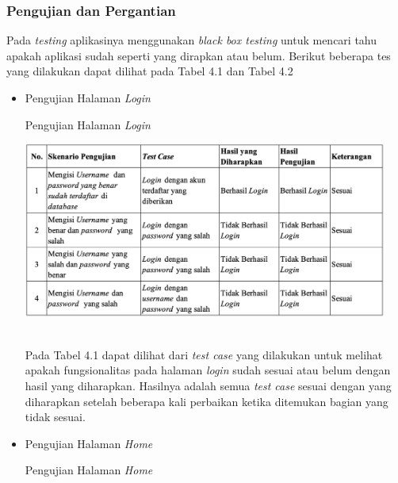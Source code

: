 \begin{flushleft}
\begin{justify}
            \subsubsection{Pengujian dan Pergantian}
            Pada \emph{testing} aplikasinya menggunakan \emph{black box testing} untuk mencari tahu apakah aplikasi 
            sudah seperti yang dirapkan atau belum. Berikut beberapa tes yang dilakukan dapat dilihat pada Tabel 4.1 dan Tabel 4.2
            \begin{itemize}
                \item Pengujian Halaman \emph{Login}
                \vspace{6cm}
                \begin{table}[ht]
                    \centering
                    \caption{Pengujian Halaman \emph{Login}}
                    \includegraphics[width=12cm]{images/bab 4/fungsional-login.png}\\
                    \end{table}
                    \\Pada Tabel 4.1 dapat dilihat dari  \emph{test case} yang dilakukan untuk melihat apakah fungsionalitas pada halaman \emph{login} sudah sesuai atau belum dengan hasil yang diharapkan. Hasilnya adalah semua \emph{test case} sesuai dengan yang diharapkan setelah beberapa kali perbaikan ketika ditemukan bagian yang tidak sesuai.
                \item Pengujian Halaman \emph{Home}\\
                \begin{table}[ht]
                    \centering
                    \caption{Pengujian Halaman \emph{Home}}

\end{table}
\end{itemize}
\end{justify}
\end{flushleft}
